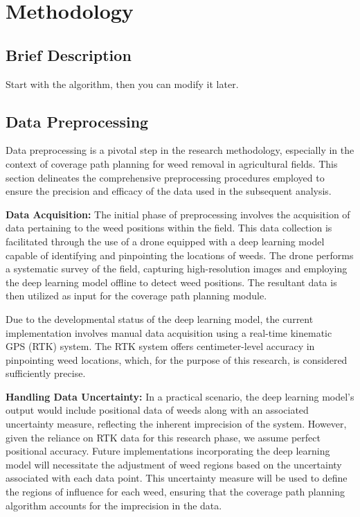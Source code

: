 \section{Methodology}

\subsection{Brief Description}

Start with the algorithm, then you can modify it later.

\subsection{Data Preprocessing}


Data preprocessing is a pivotal step in the research methodology, especially in the context of coverage path planning for weed removal in agricultural fields. This section delineates the comprehensive preprocessing procedures employed to ensure the precision and efficacy of the data used in the subsequent analysis.

\vspace*{6mm}  


\textbf{Data Acquisition: }
The initial phase of preprocessing involves the acquisition of data pertaining to the weed positions within the field. This data collection is facilitated through the use of a drone equipped with a deep learning model capable of identifying and pinpointing the locations of weeds. The drone performs a systematic survey of the field, capturing high-resolution images and employing the deep learning model offline to detect weed positions. The resultant data is then utilized as input for the coverage path planning module.

\vspace*{6mm}  


Due to the developmental status of the deep learning model, the current implementation involves manual data acquisition using a real-time kinematic GPS (RTK) system. The RTK system offers centimeter-level accuracy in pinpointing weed locations, which, for the purpose of this research, is considered sufficiently precise. 

\vspace*{6mm}  


\textbf{Handling Data Uncertainty: }
In a practical scenario, the deep learning model's output would include positional data of weeds along with an associated uncertainty measure, reflecting the inherent imprecision of the system. However, given the reliance on RTK data for this research phase, we assume perfect positional accuracy. Future implementations incorporating the deep learning model will necessitate the adjustment of weed regions based on the uncertainty associated with each data point. This uncertainty measure will be used to define the regions of influence for each weed, ensuring that the coverage path planning algorithm accounts for the imprecision in the data. 


